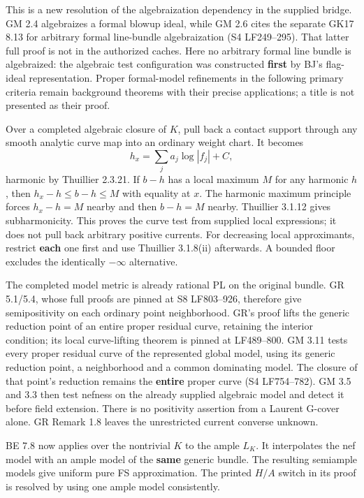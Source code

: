 \documentclass[
  10pt,
]{article}
\begin{document}
This is a new resolution of the algebraization dependency in the
supplied bridge. GM 2.4 algebraizes a formal blowup ideal, while GM 2.6
cites the separate GK17 8.13 for arbitrary formal line-bundle
algebraization (S4 LF249--295). That latter full proof is not in the
authorized caches. Here no arbitrary formal line bundle is algebraized:
the algebraic test configuration was constructed \textbf{first} by BJ's
flag-ideal representation. Proper formal-model refinements in the
following primary criteria remain background theorems with their precise
applications; a title is not presented as their proof.

Over a completed algebraic closure of \(K\), pull back a contact support
through any smooth analytic curve map into an ordinary weight chart. It
becomes \[h_x=\sum_j a_j\log|f_j|+C,\] harmonic by Thuillier 2.3.21. If
\(b-h\) has a local maximum \(M\) for any harmonic \(h\), then
\(h_x-h\le b-h\le M\) with equality at \(x\). The harmonic maximum
principle forces \(h_x-h=M\) nearby and then \(b-h=M\) nearby. Thuillier
3.1.12 gives subharmonicity. This proves the curve test from supplied
local expressions; it does not pull back arbitrary positive currents.
For decreasing local approximants, restrict \textbf{each} one first and
use Thuillier 3.1.8(ii) afterwards. A bounded floor excludes the
identically \(-\infty\) alternative.

The completed model metric is already rational PL on the original
bundle. GR 5.1/5.4, whose full proofs are pinned at S8 LF803--926,
therefore give semipositivity on each ordinary point neighborhood. GR's
proof lifts the generic reduction point of an entire proper residual
curve, retaining the interior condition; its local curve-lifting theorem
is pinned at LF489--800. GM 3.11 tests every proper residual curve of
the represented global model, using its generic reduction point, a
neighborhood and a common dominating model. The closure of that point's
reduction remains the \textbf{entire} proper curve (S4 LF754--782). GM
3.5 and 3.3 then test nefness on the already supplied algebraic model
and detect it before field extension. There is no positivity assertion
from a Laurent G-cover alone. GR Remark 1.8 leaves the unrestricted
current converse unknown.

BE 7.8 now applies over the nontrivial \(K\) to the ample \(L_K\). It
interpolates the nef model with an ample model of the \textbf{same}
generic bundle. The resulting semiample models give uniform pure FS
approximation. The printed \(H/A\) switch in its proof is resolved by
using one ample model consistently.
\end{document}
